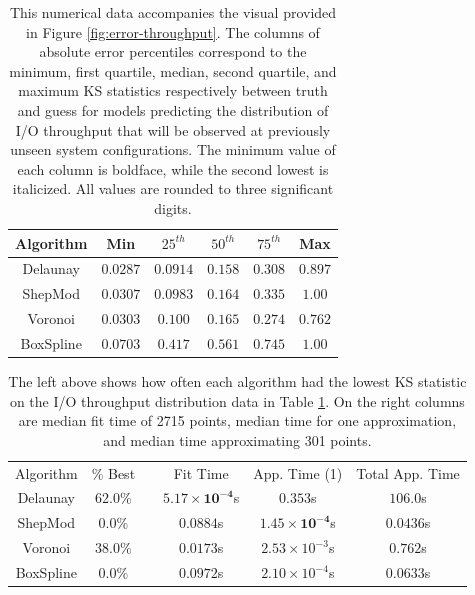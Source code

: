 \documentclass[smallextended,final]{svjour3}       %
\begin{document}
\begin{appendix}
\begin{table}
  \centering
  \begin{tabular}{c|c|c|c|c|c}
    \hline
    Algorithm & Min & $25^{th}$ & $50^{th}$ & $75^{th}$ & Max\\
    \hline
    Delaunay & $\mathbf{0.0287}$ & $\mathbf{0.0914}$ & $\mathbf{0.158}$ & $\mathit{0.308}$ & $\mathit{0.897}$\\
    ShepMod & $0.0307$ & $\mathit{0.0983}$ & $\mathit{0.164}$ & $0.335$ & $1.00$\\
    Voronoi & $\mathit{0.0303}$ & $0.100$ & $0.165$ & $\mathbf{0.274}$ & $\mathbf{0.762}$\\
    BoxSpline & $0.0703$ & $0.417$ & $0.561$ & $0.745$ & $1.00$\\
    \hline
  \end{tabular}
  \caption{This numerical data accompanies the visual provided in
    Figure \ref{fig:error-throughput}. The columns of absolute error
    percentiles correspond to the minimum, first quartile, median,
    second quartile, and maximum KS statistics respectively between
    truth and guess for models predicting the distribution of I/O
    throughput that will be observed at previously unseen system
    configurations. The minimum value of each column is boldface,
    while the second lowest is italicized. All values are rounded to
    three significant digits.}
  \label{table:error-throughput}
\end{table}

\begin{table}
  \centering
  \begin{tabular}{|c|c| c |c|c|c|}
    \cline{1-2}\cline{4-6}
    Algorithm & \% Best &  & Fit Time & App. Time (1) & Total App. Time\\
    \cline{1-2}\cline{4-6}
    Delaunay & $\mathbf{62.0}\%$ &  & $\mathbf{5.17 \times 10^{-4}}$s & $0.353$s & $106.0$s\\
    ShepMod & $0.0\%$ &  & $0.0884$s & $\mathbf{1.45 \times 10^{-4}}$s & $\mathbf{0.0436}$s\\
    Voronoi & $\mathit{38.0}\%$ &  & $\mathit{0.0173}$s & $2.53 \times 10^{-3}$s & $0.762$s\\
    BoxSpline & $0.0\%$ &  & $0.0972$s & $\mathit{2.10 \times 10^{-4}}$s & $\mathit{0.0633}$s\\
    \cline{1-2}\cline{4-6}
  \end{tabular}
  \caption{The left above shows how often each algorithm had the
    lowest KS statistic on the I/O throughput distribution data in
    Table \ref{table:error-throughput}. On the right columns are
    median fit time of 2715 points, median time for one approximation,
    and median time approximating 301 points.}
  \label{table:best-throughput}
\end{table}


\end{appendix}
\end{document}
